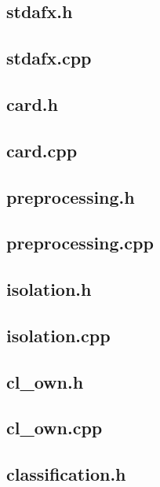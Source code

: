\documentclass[a4paper,12pt,notitlepage]{article}
\begin{document}
\begin{appendices}
		\subsection{stdafx.h}
		
		\subsection{stdafx.cpp}
		
		\subsection{card.h}
		
		\subsection{card.cpp}
		
		\subsection{preprocessing.h}
		
		\subsection{preprocessing.cpp}
		
		\subsection{isolation.h}
		
		\subsection{isolation.cpp}
		\label{app:isolationcpp}
		
		\subsection{cl\_own.h}
		
		\subsection{cl\_own.cpp}
		\label{app:clowncpp}
		
		\subsection{classification.h}
		

\end{appendices}
\end{document}
